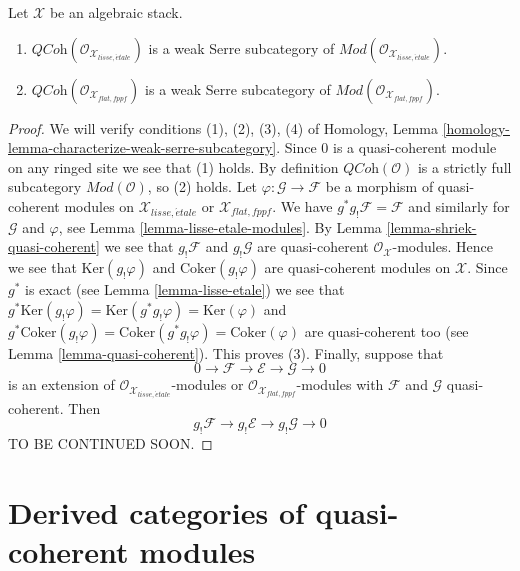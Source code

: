 \begin{lemma}
\label{lemma-quasi-coherent-weak-serre}
Let $\mathcal{X}$ be an algebraic stack.
\begin{enumerate}
\item $\textit{QCoh}(\mathcal{O}_{\mathcal{X}_{lisse,\acute{e}tale}})$
is a weak Serre subcategory of
$\textit{Mod}(\mathcal{O}_{\mathcal{X}_{lisse,\acute{e}tale}})$.
\item $\textit{QCoh}(\mathcal{O}_{\mathcal{X}_{flat,fppf}})$
is a weak Serre subcategory of
$\textit{Mod}(\mathcal{O}_{\mathcal{X}_{flat,fppf}})$.
\end{enumerate}
\end{lemma}

\begin{proof}
We will verify conditions (1), (2), (3), (4) of
Homology, Lemma \ref{homology-lemma-characterize-weak-serre-subcategory}.
Since $0$ is a quasi-coherent module on any ringed site we see that (1)
holds. By definition $\textit{QCoh}(\mathcal{O})$
is a strictly full subcategory $\textit{Mod}(\mathcal{O})$, so (2) holds.
Let $\varphi : \mathcal{G} \to \mathcal{F}$ be a morphism of quasi-coherent
modules on $\mathcal{X}_{lisse,\acute{e}tale}$ or $\mathcal{X}_{flat,fppf}$.
We have $g^*g_!\mathcal{F} = \mathcal{F}$ and similarly for
$\mathcal{G}$ and $\varphi$, see Lemma \ref{lemma-lisse-etale-modules}.
By Lemma \ref{lemma-shriek-quasi-coherent}
we see that $g_!\mathcal{F}$ and $g_!\mathcal{G}$ are quasi-coherent
$\mathcal{O}_\mathcal{X}$-modules. Hence we see that
$\text{Ker}(g_!\varphi)$ and $\text{Coker}(g_!\varphi)$ are quasi-coherent
modules on $\mathcal{X}$. Since $g^*$ is exact (see
Lemma \ref{lemma-lisse-etale}) we see that
$g^*\text{Ker}(g_!\varphi) = \text{Ker}(g^*g_!\varphi) = \text{Ker}(\varphi)$
and
$g^*\text{Coker}(g_!\varphi) = \text{Coker}(g^*g_!\varphi) =
\text{Coker}(\varphi)$
are quasi-coherent too (see Lemma \ref{lemma-quasi-coherent}).
This proves (3). Finally, suppose that
$$
0 \to \mathcal{F} \to \mathcal{E} \to \mathcal{G} \to 0
$$
is an extension of $\mathcal{O}_{\mathcal{X}_{lisse,\acute{e}tale}}$-modules
or $\mathcal{O}_{\mathcal{X}_{flat,fppf}}$-modules with $\mathcal{F}$
and $\mathcal{G}$ quasi-coherent. Then
$$
g_!\mathcal{F} \to g_!\mathcal{E} \to g_!\mathcal{G} \to 0
$$
TO BE CONTINUED SOON.
\end{proof}






\section{Derived categories of quasi-coherent modules}
\label{section-derived}

